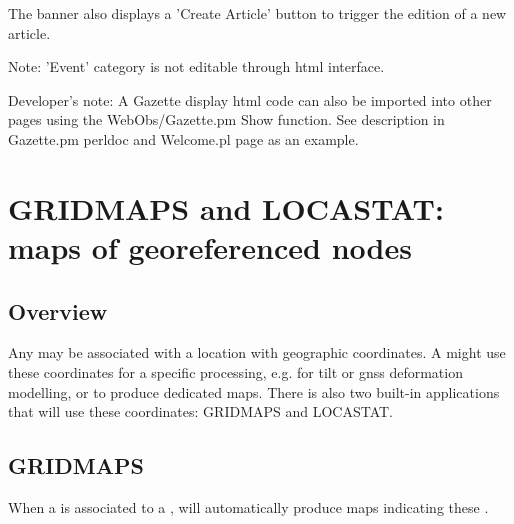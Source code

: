 The banner also displays a 'Create Article' button to trigger the edition of a new article.

Note: 'Event' category is not editable through html interface.

Developer's note: A Gazette display html code can also be imported into other pages using the WebObs/Gazette.pm 
Show function. See description in Gazette.pm perldoc and Welcome.pl page as an example.

\section{GRIDMAPS and LOCASTAT: maps of georeferenced nodes}

\subsection{Overview}

Any  may be associated with a location with geographic coordinates. A  might use these coordinates for a specific processing, e.g. for tilt or gnss deformation modelling, or to produce dedicated maps. There is also two built-in applications that will use these coordinates: GRIDMAPS and LOCASTAT.

\subsection{GRIDMAPS}
\label{gridmaps}

When a  is associated to a , \webobs will automatically produce maps indicating these .

